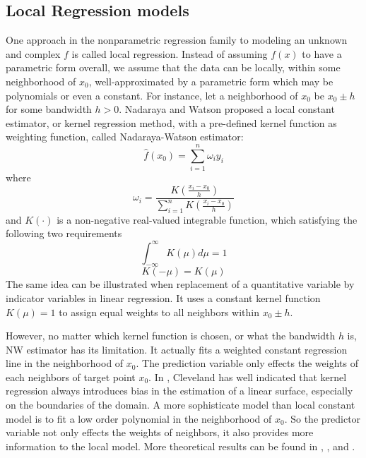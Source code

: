\subsection{Local Regression models}

One approach in the nonparametric regression family to modeling an unknown and
complex $f$ is called local regression. Instead of assuming 
$f(x)$ to have a parametric form overall, we assume that the data can be locally, 
within some neighborhood of $x_0$, well-approximated by a parametric form which 
may be polynomials or even a constant. For instance, let a neighborhood of $x_0$ 
be $x_0 \pm h$ for some bandwidth $h > 0$.
Nadaraya \cite{nadaraya1964} and Watson \cite{watson1964} proposed a local 
constant estimator, or kernel regression method, with a pre-defined kernel 
function as weighting function, called Nadaraya-Watson estimator:
\begin{equation} 
\hat f(x_0) = \sum_{i=1}^{n} \omega_{i}y_i
\end{equation} 
where 
\begin{equation} 
\omega_i = \frac{ K(\frac{x_i - x_0}{h})}{\sum_{i=1}^n K(\frac{x_i - x_0}{h})}
\end{equation} 
and $K(\cdot)$ is a non-negative real-valued integrable function, which satisfying 
the following two requirements
\begin{equation} 
\int_{-\infty}^{\infty} K(\mu)d\mu = 1
\end{equation} 
\begin{equation} 
K(-\mu) = K(\mu)
\end{equation}
The same idea can be illustrated when replacement of a quantitative variable by
indicator variables in linear regression. It uses a constant kernel function 
$K(\mu) = 1$ to assign equal weights to all neighbors within $x_0 \pm h$. 

However, no matter which kernel function is chosen, or what the bandwidth $h$ is,
NW estimator has its limitation. It actually fits a weighted constant regression
line in the neighborhood of $x_0$. The prediction variable only effects the weights
of each neighbors of target point $x_0$. In \cite{cleveland1988regression}, 
Cleveland has well indicated that kernel regression always introduces bias in the
estimation of a linear surface, especially on the boundaries of the domain. A more 
sophisticate model than local constant model is to fit a low order polynomial in 
the neighborhood of $x_0$. So the 
predictor variable not only effects the weights of neighbors, it also provides more
information to the local model. More theoretical results can be found in 
\cite{fan1992design}, \cite{fan1993local}, and \cite{hastie1993varying}.


